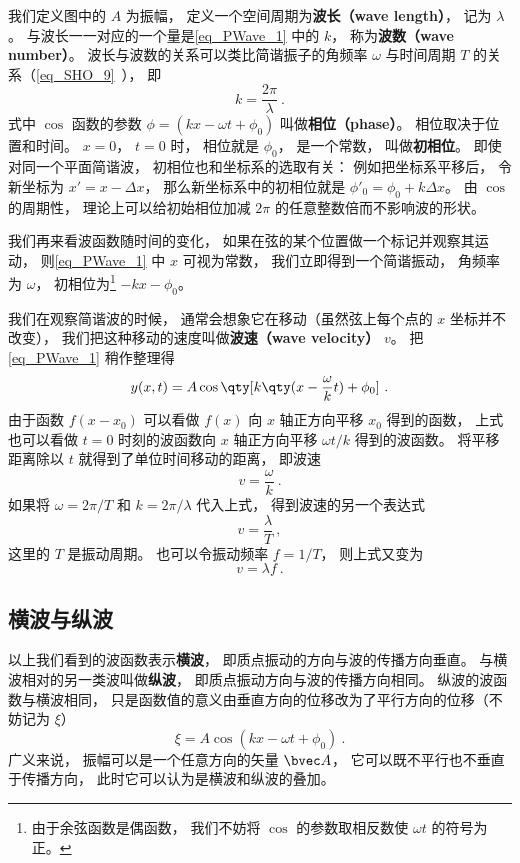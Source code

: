 我们定义图中的 $A$ 为振幅， 定义一个空间周期为\textbf{波长（wave length）}， 记为 $\lambda$。 与波长一一对应的一个量是\autoref{eq_PWave_1} 中的 $k$， 称为\textbf{波数（wave number）}。 波长与波数的关系可以类比简谐振子的角频率 $\omega$ 与时间周期 $T$ 的关系（\autoref{eq_SHO_9}~）， 即
\begin{equation}\label{eq_PWave_2}
k = \frac{2\pi}{\lambda}~.
\end{equation}
式中 $\cos$ 函数的参数 $\phi = (k x - \omega t + \phi_0)$ 叫做\textbf{相位（phase）}。 相位取决于位置和时间。 $x=0$， $t=0$ 时， 相位就是 $\phi_0$， 是一个常数， 叫做\textbf{初相位}。 即使对同一个平面简谐波， 初相位也和坐标系的选取有关： 例如把坐标系平移后， 令新坐标为 $x' = x - \Delta x$， 那么新坐标系中的初相位就是 $\phi'_0 = \phi_0 + k\Delta x$。 由 $\cos$ 的周期性， 理论上可以给初始相位加减 $2\pi$ 的任意整数倍而不影响波的形状。

我们再来看波函数随时间的变化， 如果在弦的某个位置做一个标记并观察其运动， 则\autoref{eq_PWave_1} 中 $x$ 可视为常数， 我们立即得到一个简谐振动， 角频率为 $\omega$， 初相位为\footnote{由于余弦函数是偶函数， 我们不妨将 $\cos$ 的参数取相反数使 $\omega t$ 的符号为正。} $-kx - \phi_0$。

我们在观察简谐波的时候， 通常会想象它在移动（虽然弦上每个点的 $x$ 坐标并不改变）， 我们把这种移动的速度叫做\textbf{波速（wave velocity）} $v$。 把\autoref{eq_PWave_1} 稍作整理得
\begin{equation}
y(x, t) = A\cos \qty[k \qty(x - \frac{\omega}{k} t) + \phi_0]~.
\end{equation}
由于函数 $f(x - x_0)$ 可以看做 $f(x)$ 向 $x$ 轴正方向平移 $x_0$ 得到的函数， 上式也可以看做 $t = 0$ 时刻的波函数向 $x$ 轴正方向平移 $\omega t/k$ 得到的波函数。 将平移距离除以 $t$ 就得到了单位时间移动的距离， 即波速
\begin{equation}
v = \frac{\omega}{k}~.
\end{equation}
如果将 $\omega = 2\pi/T$ 和 $k = 2\pi/\lambda$ 代入上式， 得到波速的另一个表达式
\begin{equation}
v = \frac{\lambda}{T}~,
\end{equation}
这里的 $T$ 是振动周期。 也可以令振动频率 $f = 1/T$， 则上式又变为
\begin{equation}
v = \lambda f~.
\end{equation}

\subsection{横波与纵波}\label{sub_PWave_1}
以上我们看到的波函数表示\textbf{横波}， 即质点振动的方向与波的传播方向垂直。 与横波相对的另一类波叫做\textbf{纵波}， 即质点振动方向与波的传播方向相同。 纵波的波函数与横波相同， 只是函数值的意义由垂直方向的位移改为了平行方向的位移（不妨记为 $\xi$）
\begin{equation}
\xi = A \cos(k x - \omega t + \phi_0)~.
\end{equation}
广义来说， 振幅可以是一个任意方向的矢量 $\bvec A$， 它可以既不平行也不垂直于传播方向， 此时它可以认为是横波和纵波的叠加。

